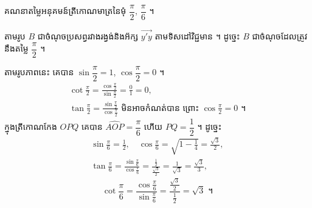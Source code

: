 \begin{example}[ឧទាហរណ៍]
គណនាតម្លៃអនុគមន៍ត្រីកោណមាត្រនៃមុំ $\dfrac{\pi}{2}$, $\dfrac{\pi}{6}$ ។

តាមរូប $B$ ជាចំណុចប្រសព្វរវាងរង្វង់និងអ័ក្ស $\overrightarrow{y'y}$ តាមទិសដៅវិជ្ជមាន ។ ដូច្នេះ $B$ ជាចំណុចដែលត្រូវនឹងតម្លៃ $\dfrac{\pi}{2}$ ។
\begin{center}
\end{center}
តាមរូបភាពនេះ គេបាន $\sin\dfrac{\pi}{2} = 1$, $\cos\dfrac{\pi}{2} = 0$ ។
\[
\begin{gathered}
\cot\frac{\pi}{2} = \frac{\cos\frac{\pi}{2}}{\sin\frac{\pi}{2}} = \frac{0}{1} = 0,\\
\tan\frac{\pi}{2} = \frac{\sin\frac{\pi}{2}}{\cos\frac{\pi}{2}} \text{ មិនអាចកំណត់បាន ព្រោះ } \cos\frac{\pi}{2} = 0 \text{ ។}
\end{gathered}
\]
ក្នុងត្រីកោណកែង $OPQ$ គេបាន $\widehat{AOP} = \dfrac{\pi}{6}$ ហើយ $PQ = \dfrac{1}{2}$ ។ ដូច្នេះ
\[
\begin{gathered}
\sin\frac{\pi}{6} = \frac{1}{2}, \quad \cos\frac{\pi}{6} = \sqrt{1 - \frac{1}{4}} = \frac{\sqrt{3}}{2},\\
\tan\frac{\pi}{6} = \frac{\sin\frac{\pi}{6}}{\cos\frac{\pi}{6}} = \frac{\frac{1}{2}}{\frac{\sqrt{3}}{2}} = \frac{1}{\sqrt{3}} = \frac{\sqrt{3}}{3},
\end{gathered}
\]
\[ \cot\frac{\pi}{6} = \frac{\cos\frac{\pi}{6}}{\sin\frac{\pi}{6}} = \frac{\frac{\sqrt{3}}{2}}{\frac{1}{2}} = \sqrt{3} \text{ ។} \]
\end{example}


